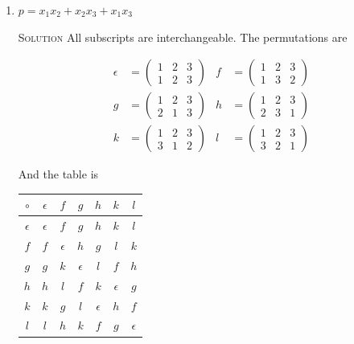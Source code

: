 \documentclass[twoside]{amsart}
\newcommand{\solution}{\textsc{Solution}\xspace}
\newcommand{\eps}{\ensuremath{\epsilon}\xspace}
\begin{document}
\begin{enumerate}[A.]
\begin{enumerate}[1]
      \vspace{5pt}
      \item $p=x_1x_2 + x_2x_3 + x_1x_3$

      \noindent \solution All subscripts are interchangeable. The
      permutations are

      \begin{align*}
         \eps &= \begin{pmatrix}
	            1 & 2 & 3 \\
		    1 & 2 & 3
		 \end{pmatrix}
		 &
	 f    &= \begin{pmatrix}
	            1 & 2 & 3 \\
		    1 & 3 & 2
		 \end{pmatrix}
	         \\
         g    &= \begin{pmatrix}
	            1 & 2 & 3 \\
		    2 & 1 & 3 
		 \end{pmatrix}
		 &
	 h    &= \begin{pmatrix}
	            1 & 2 & 3 \\
		    2 & 3 & 1
		 \end{pmatrix}
		 \\
	 k    &= \begin{pmatrix}
	            1 & 2 & 3 \\
		    3 & 1 & 2 
		 \end{pmatrix}
		 &
	 l    &= \begin{pmatrix}
	            1 & 2 & 3 \\
		    3 & 2 & 1
		 \end{pmatrix}
      \end{align*}

      And the table is

      \vspace{5pt}
      \begin{center}
      \begin{tabular}{c|cccccc}
        $\circ$ & $\eps$ & $f$ & $g$ & $h$ & $k$ & $l$ \\ \hline
	$\eps$  & $\eps$ & $f$ & $g$ & $h$ & $k$ & $l$ \\ 
	$f$     & $f$ & $\eps$ & $h$ & $g$ & $l$ & $k$ \\
	$g$     & $g$ & $k$ & $\eps$ & $l$ & $f$ & $h$ \\
	$h$     & $h$ & $l$ & $f$ & $k$ & $\eps$ & $g$ \\
	$k$     & $k$ & $g$ & $l$ & $\eps$ & $h$ & $f$ \\
	$l$     & $l$ & $h$ & $k$ & $f$ & $g$ & $\eps$
      \end{tabular}
      \end{center}


\end{enumerate}
\end{enumerate}
\end{document}
